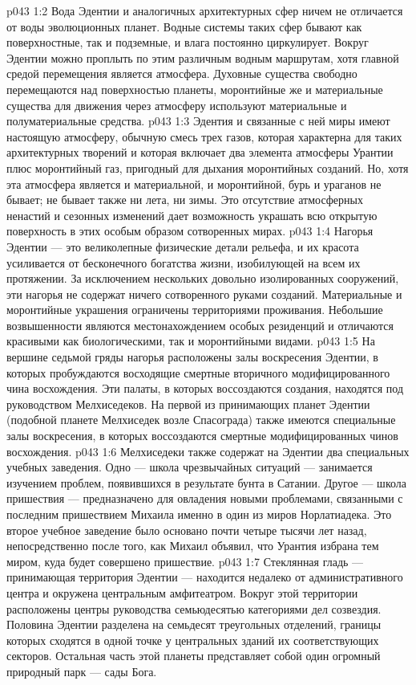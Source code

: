 \vs p043 1:2 Вода Эдентии и аналогичных архитектурных сфер ничем не отличается от воды эволюционных планет. Водные системы таких сфер бывают как поверхностные, так и подземные, и влага постоянно циркулирует. Вокруг Эдентии можно проплыть по этим различным водным маршрутам, хотя главной средой перемещения является атмосфера. Духовные существа свободно перемещаются над поверхностью планеты, моронтийные же и материальные существа для движения через атмосферу используют материальные и полуматериальные средства.
\vs p043 1:3 Эдентия и связанные с ней миры имеют настоящую атмосферу, обычную смесь трех газов, которая характерна для таких архитектурных творений и которая включает два элемента атмосферы Урантии плюс моронтийный газ, пригодный для дыхания моронтийных созданий. Но, хотя эта атмосфера является и материальной, и моронтийной, бурь и ураганов не бывает; не бывает также ни лета, ни зимы. Это отсутствие атмосферных ненастий и сезонных изменений дает возможность украшать всю открытую поверхность в этих особым образом сотворенных мирах.
\vs p043 1:4 Нагорья Эдентии --- это великолепные физические детали рельефа, и их красота усиливается от бесконечного богатства жизни, изобилующей на всем их протяжении. За исключением нескольких довольно изолированных сооружений, эти нагорья не содержат ничего сотворенного руками созданий. Материальные и моронтийные украшения ограничены территориями проживания. Небольшие возвышенности являются местонахождением особых резиденций и отличаются красивыми как биологическими, так и моронтийными видами.
\vs p043 1:5 \pc На вершине седьмой гряды нагорья расположены залы воскресения Эдентии, в которых пробуждаются восходящие смертные вторичного модифицированного чина восхождения. Эти палаты, в которых воссоздаются создания, находятся под руководством Мелхиседеков. На первой из принимающих планет Эдентии (подобной планете Мелхиседек возле Спасограда) также имеются специальные залы воскресения, в которых воссоздаются смертные модифицированных чинов восхождения.
\vs p043 1:6 Мелхиседеки также содержат на Эдентии два специальных учебных заведения. Одно --- школа чрезвычайных ситуаций --- занимается изучением проблем, появившихся в результате бунта в Сатании. Другое --- школа пришествия --- предназначено для овладения новыми проблемами, связанными с последним пришествием Михаила именно в один из миров Норлатиадека. Это второе учебное заведение было основано почти четыре тысячи лет назад, непосредственно после того, как Михаил объявил, что Урантия избрана тем миром, куда будет совершено пришествие.
\vs p043 1:7 \pc Стеклянная гладь --- принимающая территория Эдентии --- находится недалеко от административного центра и окружена центральным амфитеатром. Вокруг этой территории расположены центры руководства семьюдесятью категориями дел созвездия. Половина Эдентии разделена на семьдесят треугольных отделений, границы которых сходятся в одной точке у центральных зданий их соответствующих секторов. Остальная часть этой планеты представляет собой один огромный природный парк --- сады Бога.
